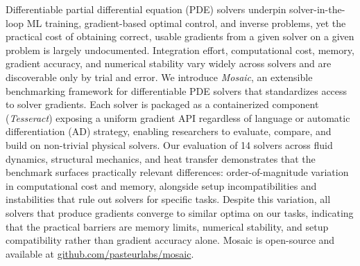 Differentiable partial differential equation (PDE) solvers underpin
solver-in-the-loop ML training, gradient-based optimal control, and
inverse problems, yet the practical cost of obtaining correct, usable
gradients from a given solver on a given problem is largely
undocumented. Integration effort, computational cost, memory, gradient accuracy,
and numerical stability vary widely across solvers and are
discoverable only by trial and error.
%
We introduce \textit{Mosaic}, an extensible benchmarking framework for
differentiable PDE solvers that standardizes access to solver gradients.
Each solver is packaged as a containerized component
(\textit{Tesseract}) exposing a uniform gradient API regardless of
language or automatic differentiation (AD) strategy, enabling
researchers to evaluate, compare, and build on non-trivial physical solvers.
%
Our evaluation of 14 solvers across fluid dynamics, structural
mechanics, and heat transfer demonstrates that the benchmark surfaces
practically relevant differences: order-of-magnitude variation in
computational cost and memory, alongside setup
incompatibilities and instabilities that rule out solvers for specific
tasks.
Despite this variation, all solvers that
produce gradients converge to similar optima on our tasks, indicating that the
practical barriers are memory limits, numerical stability, and setup
compatibility rather than gradient accuracy alone.
%
Mosaic is open-source and available at \href{https://github.com/pasteurlabs/mosaic}{github.com/pasteurlabs/mosaic}.
